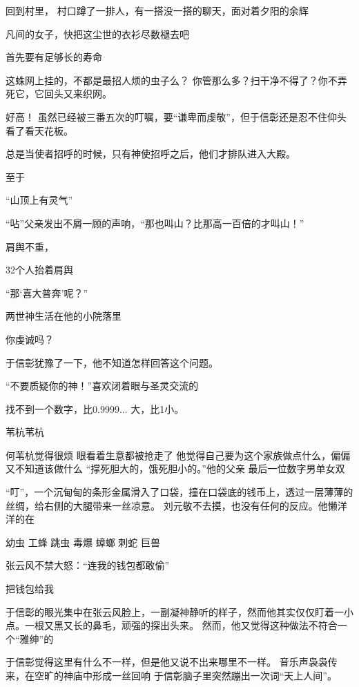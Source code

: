 回到村里，
村口蹲了一排人，有一搭没一搭的聊天，面对着夕阳的余辉

凡间的女子，快把这尘世的衣衫尽数褪去吧

首先要有足够长的寿命

这蛛网上挂的，不都是最招人烦的虫子么？
你管那么多？扫干净不得了？你不弄死它，它回头又来织网。

好高！
虽然已经被三番五次的叮嘱，要“谦卑而虔敬”，但于信彰还是忍不住仰头看了看天花板。

总是当使者招呼的时候，只有神使招呼之后，他们才排队进入大殿。

至于

“山顶上有灵气”

“呫”父亲发出不屑一顾的声响，“那也叫山？比那高一百倍的才叫山！”



肩舆不重，

32个人抬着肩舆



“那‘喜大普奔’呢？”

两世神生活在他的小院落里

你虔诚吗？

于信彰犹豫了一下，他不知道怎样回答这个问题。

“不要质疑你的神！”喜欢闭着眼与圣灵交流的

找不到一个数字，比0.9999... 大，比1小。




苇杭苇杭

何苇杭觉得很烦
眼看着生意都被抢走了
他觉得自己要为这个家族做点什么，偏偏又不知道该做什么
“撑死胆大的，饿死胆小的。”他的父亲
最后一位数字男单女双

“叮”，一个沉甸甸的条形金属滑入了口袋，撞在口袋底的钱币上，透过一层薄薄的丝绸，给右侧的大腿带来一丝凉意。
刘元敬不去摸，也没有任何的反应。他懒洋洋的在

幼虫
工蜂
跳虫
毒爆
蟑螂
刺蛇
巨兽

张云风不禁大怒：“连我的钱包都敢偷”

把钱包给我

于信彰的眼光集中在张云风脸上，一副凝神静听的样子，然而他其实仅仅盯着一小点。一根又黑又长的鼻毛，顽强的探出头来。
然而，他又觉得这种做法不符合一个“雅绅”的



于信彰觉得这里有什么不一样，但是他又说不出来哪里不一样。
音乐声袅袅传来，在空旷的神庙中形成一丝回响
于信彰脑子里突然蹦出一次词“天上人间”。

